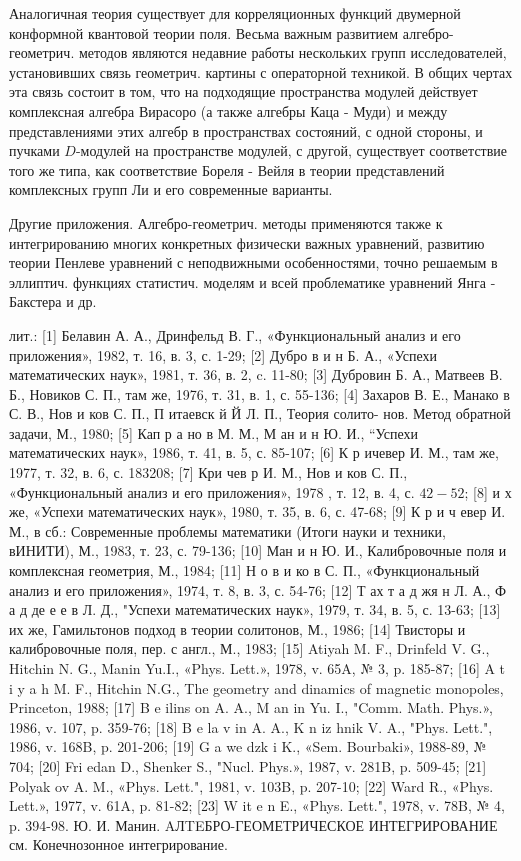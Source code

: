 \documentclass[10pt]{article}
\begin{document}
Аналогичная теория существует для корреляционных функций двумерной конформной квантовой теории поля. Весьма важным развитием алгебро-геометрич. методов являются недавние работы нескольких групп исследователей, установивших связь геометрич. картины с операторной техникой. В общих чертах эта связь состоит в том, что на подходящие пространства модулей действует комплексная алгебра Вирасоро (а также алгебры Каца - Муди) и между представлениями этих алгебр в пространствах состояний, с одной стороны, и пучками $D$-модулей на пространстве модулей, с другой, существует соответствие того же типа, как соответствие Бореля - Вейля в теории представлений комплексных групп Ли и его современные варианты.



Другие приложения. Алгебро-геометрич. методы применяются также к интегрированию многих конкретных физически важных уравнений, развитию теории Пенлеве уравнений с неподвижными особенностями, точно решаемым в эллиптич. функциях статистич. моделям и всей проблематике уравнений Янга - Бакстера и др.



лит.: [1] Белавин А. А., Дринфельд В. Г., «Функциональный анализ и его приложения», 1982, т. 16, в. 3, с. 1-29; [2] Дубро в и н Б. А., «Успехи математических наук», 1981, т. 36, в. 2, c. 11-80; [3] Дубровин Б. А., Матвеев В. Б., Новиков С. П., там же, 1976, т. 31, в. 1, с. 55-136; [4] Захаров В. Е., Манако в С. В., Нов и ков С. П., П итаевск й Й Л. П., Теория солито- нов. Метод обратной задачи, М., 1980; [5] Кап р а но в М. М., М ан и н Ю. И., “Успехи математических наук», 1986, т. 41, в. 5, с. 85-107; [6] К р ичевер И. М., там же, 1977, т. 32, в. 6, с. 183208; [7] Кри чев р И. М., Нов и ков С. П., «Функциональный анализ и его приложения», 1978 , т. 12, в. 4, с. $42-52$; [8] и х же, «Успехи математических наук», 1980, т. 35, в. 6, с. 47-68; [9] К р и ч евер И. М., в сб.: Современные проблемы математики (Итоги науки и техники, вИНИТИ), М., 1983, т. 23, с. 79-136; [10] Ман и н Ю. И., Калибровочные поля и комплексная геометрия, М., 1984; [11] Н о в и ко в С. П., «Функциональный анализ и его приложения», 1974, т. 8, в. 3, с. 54-76; [12] Т ах т а д жя н Л. А., Ф а д де е е в Л. Д., "Успехи математических наук», 1979, т. 34, в. 5, с. 13-63; [13] их же, Гамильтонов подход в теории солитонов, М., 1986; [14] Твисторы и калибровочные поля, пер. с англ., М., 1983; [15] Atiyah M. F., Drinfeld V. G., Hitchin N. G., Manin Yu.I., «Phys. Lett.», 1978, v. 65A, № 3, p. 185-87; [16] A t i y a h M. F., Hitchin N.G., The geometry and dinamics of magnetic monopoles, Princeton, 1988; [17] B e ilins on A. A., M an in Yu. I., "Comm. Math. Phys.», 1986, v. 107, p. 359-76; [18] B e la v in A. A., K n iz hnik V. A., "Phys. Lett.", 1986, v. 168B, p. 201-206; [19] G a we dzk i K., «Sem. Bourbaki», 1988-89, № 704; [20] Fri edan D., Shenker S., "Nucl. Phys.», 1987, v. 281B, p. 509-45; [21] Polyak ov A. M., «Phys. Lett.", 1981, v. 103B, p. 207-10; [22] Ward R., «Phys. Lett.», 1977, v. 61A, p. 81-82; [23] W it e n E., «Phys. Lett.", 1978, v. 78B, № 4, p. 394-98. Ю. И. Манин. AЛTEБРО-ГЕОМЕТРИЧЕСКОЕ ИНТЕГРИРОВАНИЕ см. Конечнозонное интегрирование.
\end{document}
